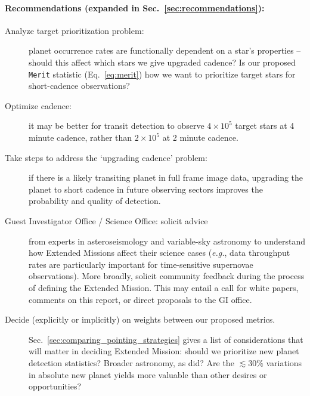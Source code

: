 \paragraph{Recommendations (expanded in Sec.~\ref{sec:recommendations}):}

\begin{description}
	\item[Analyze target prioritization problem:] planet occurrence rates are functionally dependent on a star's properties -- should this affect which stars we give upgraded cadence?
	Is our proposed \texttt{Merit} statistic (Eq.~\ref{eq:merit}) how we want to prioritize target stars for short-cadence observations?
	
	\item[Optimize cadence:] it may be better for transit detection to observe $4\times10^5$ target stars at 4 minute cadence, rather than $2\times10^5$ at 2 minute cadence.
	
	\item[Take steps to address the `upgrading cadence' problem:] 
	if there is a likely transiting planet in full frame image data, upgrading the planet to short cadence in future observing sectors improves the probability and quality of detection.
	
	\item[Guest Investigator Office / \tess Science Office: solicit advice]
	from experts in asteroseismology and variable-sky astronomy to understand how Extended Missions affect their science cases (\textit{e.g.}, data throughput rates are particularly important for time-sensitive supernovae observations).
	More broadly, solicit community feedback during the process of defining the Extended Mission.
	This may entail a call for white papers, comments on this report, or direct proposals to the GI office. 
	
	\item[Decide (explicitly or implicitly) on weights between our proposed metrics.]
	Sec.~\ref{sec:comparing_pointing_strategies} gives a list of considerations that will matter in deciding \tesss Extended Mission: should we prioritize new planet detection statistics? Broader astronomy, as \ktwo did?
	Are the $\lesssim30\%$ variations in absolute new planet yields more valuable than other desires or opportunities?
	

\end{description}
